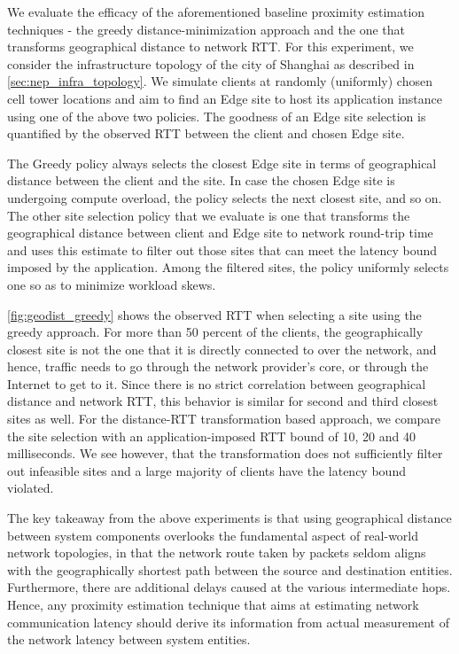 \par We evaluate the efficacy of the aforementioned baseline proximity estimation techniques - the greedy distance-minimization approach and the one that transforms geographical distance to network RTT. For this experiment, we consider the infrastructure topology of the city of Shanghai as described in \cref{sec:nep_infra_topology}. We simulate clients at randomly (uniformly) chosen cell tower locations and aim to find an Edge site to host its application instance using one of the above two policies. The goodness of an Edge site selection is quantified by the observed RTT between the client and chosen Edge site. 
\par The Greedy policy always selects the closest Edge site in terms of geographical distance between the client and the site. In case the chosen Edge site is undergoing compute overload, the policy selects the next closest site, and so on. The other site selection policy that we evaluate is one that transforms the geographical distance between client and Edge site to network round-trip time and uses this estimate to filter out those sites that can meet the latency bound imposed by the application. Among the filtered sites, the policy uniformly selects one so as to minimize workload skews.
\par \cref{fig:geodist_greedy} shows the observed RTT when selecting a site using the greedy approach. For more than 50 percent of the clients, the geographically closest site is not the one that it is directly connected to over the network, and hence, traffic needs to go through the network provider's core, or through the Internet to get to it. Since there is no strict correlation between geographical distance and network RTT, this behavior is similar for second and third closest sites as well. For the distance-RTT transformation based approach, we compare the site selection with an application-imposed RTT bound of 10, 20 and 40 milliseconds. We see however, that the transformation does not sufficiently filter out infeasible sites and a large majority of clients have the latency bound violated.
\par The key takeaway from the above experiments is that using geographical distance between system components overlooks the fundamental aspect of real-world network topologies, in that the network route taken by packets seldom aligns with the geographically shortest path between the source and destination entities. Furthermore, there are additional delays caused at the various intermediate hops. Hence, any proximity estimation technique that aims at estimating network communication latency should derive its information from actual measurement of the network latency between system entities.

